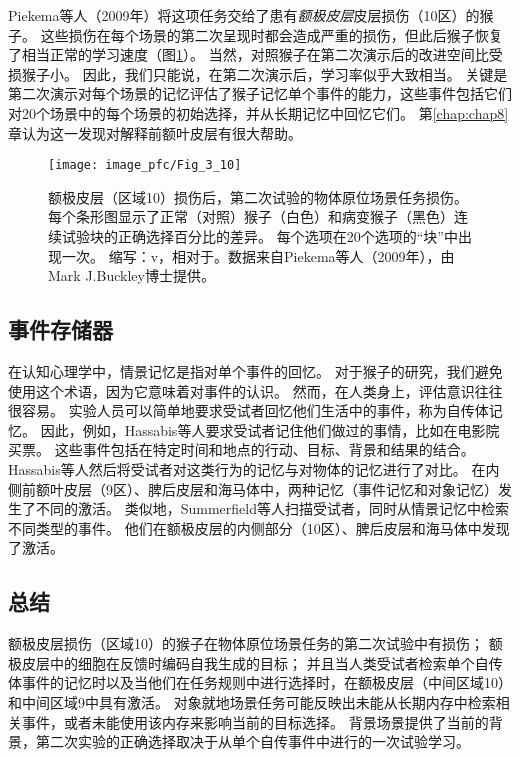 Piekema等人（2009年）将这项任务交给了患有\textit{额极皮层}皮层损伤（10区）的猴子。
这些损伤在每个场景的第二次呈现时都会造成严重的损伤，但此后猴子恢复了相当正常的学习速度（图\ref{fig:3_10}）。
当然，对照猴子在第二次演示后的改进空间比受损猴子小。
因此，我们只能说，在第二次演示后，学习率似乎大致相当。
关键是第二次演示对每个场景的记忆评估了猴子记忆单个事件的能力，这些事件包括它们对20个场景中的每个场景的初始选择，并从长期记忆中回忆它们。
第\ref{chap:chap8}章认为这一发现对解释前额叶皮层有很大帮助。\par


\begin{figure}[!htb]
	\centering
	\texttt{[image: image\_pfc/Fig\_3\_10]}
	\caption{额极皮层（区域10）损伤后，第二次试验的物体原位场景任务损伤。每个条形图显示了正常（对照）猴子（白色）和病变猴子（黑色）连续试验块的正确选择百分比的差异。
		每个选项在20个选项的“块”中出现一次。
		缩写：v，相对于。数据来自Piekema等人（2009年），由Mark J.Buckley博士提供。}
	\label{fig:3_10}
\end{figure}



\subsection{事件存储器}

在认知心理学中，情景记忆是指对单个事件的回忆。
对于猴子的研究，我们避免使用这个术语，因为它意味着对事件的认识。
然而，在人类身上，评估意识往往很容易。
实验人员可以简单地要求受试者回忆他们生活中的事件，称为自传体记忆。
因此，例如，Hassabis等人\cite{hassabis2007using}要求受试者记住他们做过的事情，比如在电影院买票。
这些事件包括在特定时间和地点的行动、目标、背景和结果的结合。
Hassabis等人然后将受试者对这类行为的记忆与对物体的记忆进行了对比。
在内侧前额叶皮层（9区）、脾后皮层和海马体中，两种记忆（事件记忆和对象记忆）发生了不同的激活。
类似地，Summerfield等人\cite{summerfield2009decision}扫描受试者，同时从情景记忆中检索不同类型的事件。
他们在额极皮层的内侧部分（10区）、脾后皮层和海马体中发现了激活。\par



\subsection{总结}

额极皮层损伤（区域10）的猴子在物体原位场景任务的第二次试验中有损伤；
额极皮层中的细胞在反馈时编码自我生成的目标；
并且当人类受试者检索单个自传体事件的记忆时以及当他们在任务规则中进行选择时，在额极皮层（中间区域10）和中间区域9中具有激活。
对象就地场景任务可能反映出未能从长期内存中检索相关事件，或者未能使用该内存来影响当前的目标选择。
背景场景提供了当前的背景，第二次实验的正确选择取决于从单个自传事件中进行的一次试验学习。\par


